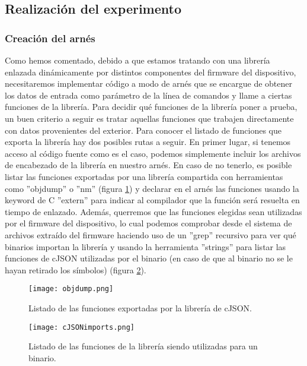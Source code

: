 \subsection{Realización del experimento}
\subsubsection{Creación del arnés}
Como hemos comentado, debido a que estamos tratando con una librería enlazada dinámicamente por distintos componentes del firmware del dispositivo, necesitaremos
implementar código a modo de arnés que se encargue de obtener los datos de entrada como parámetro de la línea de comandos y llame a ciertas funciones de la librería.
Para decidir qué funciones de la librería poner a prueba, un buen criterio a seguir es tratar aquellas funciones que trabajen directamente 
con datos provenientes del exterior. Para conocer el listado de funciones que exporta la librería hay dos posibles rutas a seguir. En primer lugar, si tenemos acceso al código
fuente como es el caso, podemos simplemente incluir los archivos de encabezado de la librería en nuestro arnés. En caso de no tenerlo, es posible listar las funciones
exportadas por una librería compartida con herramientas como ''objdump'' o ''nm'' (figura \ref{fig:objdump}) y declarar en el arnés las funciones usando 
la keyword de C ''extern'' para indicar al
compilador que la función será resuelta en tiempo de enlazado. Además, querremos que las funciones elegidas sean utilizadas por el firmware del dispositivo, lo
cual podemos comprobar desde el sistema de archivos extraído del firmware haciendo uso de un ''grep'' recursivo para ver qué binarios importan la librería y usando la herramienta ''strings'' para listar
las funciones de cJSON utilizadas por el binario (en caso de que al binario no se le hayan retirado los símbolos) (figura \ref{fig:cJSONimports}).

\begin{figure}[H]
    \centering
    \texttt{[image: objdump.png]}
    \caption{Listado de las funciones exportadas por la librería de cJSON.}
    \label{fig:objdump}
\end{figure}

\begin{figure}[H]
    \centering
    \texttt{[image: cJSONimports.png]}
    \caption{Listado de las funciones de la librería siendo utilizadas para un binario.}
    \label{fig:cJSONimports}
\end{figure}

